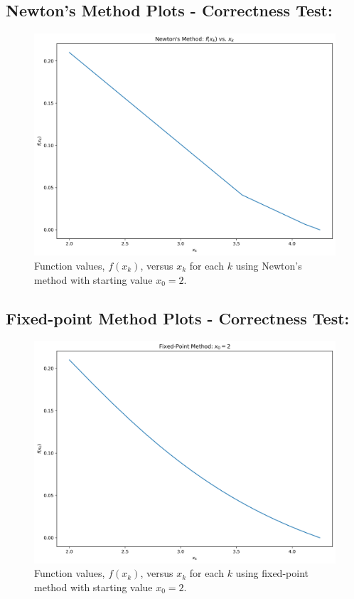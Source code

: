 \documentclass[11pt]{article}
\begin{document}
\subsection{Newton's Method Plots - Correctness Test:}
\begin{figure}[H]
	\centering
	\includegraphics[width=\linewidth]{../figures/Newtons_Test}
	\caption{Function values, $f(x_k)$, versus $x_k$ for each $k$ using Newton's method with starting value $x_0 = 2$.}
	\label{fig:newtons_test}
\end{figure}

\subsection{Fixed-point Method Plots - Correctness Test:}
\begin{figure}[H]
	\centering
	\includegraphics[width=\linewidth]{../figures/Fixed_Test_fx}
	\caption{Function values, $f(x_k)$, versus $x_k$ for each $k$ using fixed-point method with starting value $x_0 = 2$.}
	\label{fig:fixed_test}
\end{figure}
\end{document}
